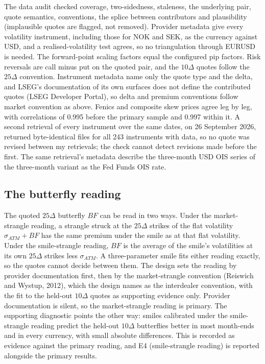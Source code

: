 \documentclass[11pt]{article}
\theoremstyle{result}
\newcommand{\D}{\Delta}
\begin{document}
The data audit checked coverage, two-sidedness, staleness, the underlying pair, quote semantics, conventions, the splice between contributors and plausibility (implausible quotes are flagged, not removed). Provider metadata give every volatility instrument, including those for NOK and SEK, as the currency against USD, and a realised-volatility test agrees, so no triangulation through EURUSD is needed. The forward-point scaling factors equal the configured pip factors. Risk reversals are call minus put on the quoted pair, and the $10\D$ quotes follow the $25\D$ convention. Instrument metadata name only the quote type and the delta, and LSEG's documentation of its own surfaces does not define the contributed quotes (LSEG Developer Portal), so delta and premium conventions follow market convention as above. Fenics and composite skew prices agree leg by leg, with correlations of 0.995 before the primary sample and 0.997 within it. A second retrieval of every instrument over the same dates, on 26 September 2026, returned byte-identical files for all 243 instruments with data, so no quote was revised between my retrievals; the check cannot detect revisions made before the first. The same retrieval's metadata describe the three-month USD OIS series of the three-month variant as the Fed Funds OIS rate.

\subsection{The butterfly reading}\label{sec:bf}

The quoted $25\D$ butterfly $BF$ can be read in two ways. Under the market-strangle reading, a strangle struck at the $25\D$ strikes of the flat volatility $\sigma_{ATM}+BF$ has the same premium under the smile as at that flat volatility. Under the smile-strangle reading, $BF$ is the average of the smile's volatilities at its own $25\D$ strikes less $\sigma_{ATM}$. A three-parameter smile fits either reading exactly, so the quotes cannot decide between them. The design sets the reading by provider documentation first, then by the market-strangle convention (Reiswich and Wystup, 2012), which the design names as the interdealer convention, with the fit to the held-out $10\D$ quotes as supporting evidence only. Provider documentation is silent, so the market-strangle reading is primary. The supporting diagnostic points the other way: smiles calibrated under the smile-strangle reading predict the held-out $10\D$ butterflies better in most month-ends and in every currency, with small absolute differences. This is recorded as evidence against the primary reading, and E4 (smile-strangle reading) is reported alongside the primary results.
\end{document}
